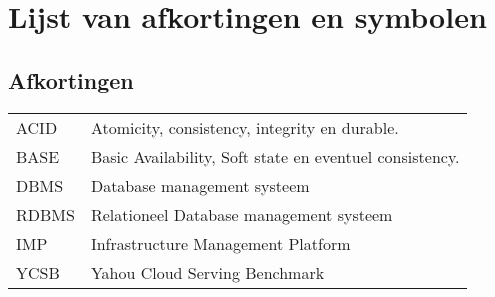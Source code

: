 \chapter{Lijst van afkortingen en symbolen}
\section*{Afkortingen}
\begin{flushleft}
  \renewcommand{\arraystretch}{1.1}
  \begin{tabularx}{\textwidth}{@{}p{12mm}X@{}}
    ACID & Atomicity, consistency, integrity en durable.  \\
   	BASE & Basic Availability, Soft state en eventuel consistency.  \\
    DBMS   & Database management systeem \\
    RDBMS   & Relationeel Database management systeem \\
    IMP   & Infrastructure Management Platform \\
    YCSB & Yahou Cloud Serving Benchmark \\



  \end{tabularx}
\end{flushleft}